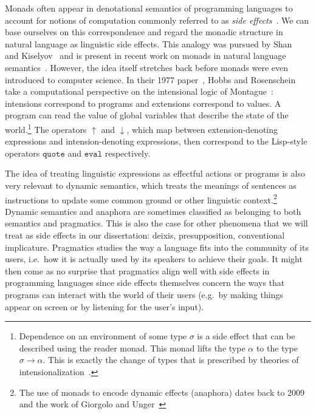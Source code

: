 Monads often appear in denotational semantics of programming languages to
account for notions of computation commonly referred to as \emph{side
  effects}~\cite{moggi1991notions}. We can base ourselves on this
correspondence and regard the monadic structure in natural language as
linguistic side effects. This analogy was pursued by
Shan~\cite{shan2005linguistic,shan2005thesis} and
Kiselyov~\cite{kiselyov2008call} and is present in recent work on monads in
natural language
semantics~\cite{giorgolo2012monads,charlow2014semantics}. However, the idea
itself stretches back before monads were even introduced to computer
science. In their 1977 paper~\cite{hobbs1977making}, Hobbs and Rosenschein
take a computational perspective on the intensional logic of
Montague~\cite{montague1973proper}: intensions correspond to programs and
extensions correspond to values. A program can read the value of global
variables that describe the state of the world.\footnote{Dependence on an
  environment of some type $\sigma$ is a side effect that can be described
  using the reader monad. This monad lifts the type $\alpha$ to the type
  $\sigma \to \alpha$. This is exactly the change of types that is
  prescribed by theories of
  intensionalization~\cite{ben2007semantics,de2013note}.} The operators
$\uparrow$ and $\downarrow$, which map between extension-denoting
expressions and intension-denoting expressions, then correspond to the
Lisp-style operators $\texttt{quote}$ and $\texttt{eval}$ respectively.

The idea of treating linguistic expressions as effectful actions or programs is
also very relevant to dynamic semantics, which treats the meanings of sentences
as instructions to update some common ground or other linguistic
context.\footnote{The use of monads to encode dynamic effects (anaphora) dates
  back to 2009 and the work of Giorgolo and
  Unger~\cite{giorgolo2009coreference,unger2012dynamic}} Dynamic semantics and
anaphora are sometimes classified as belonging to both semantics and pragmatics.
This is also the case for other phenomena that we will treat as side effects in
our dissertation: deixis, presupposition, conventional implicature. Pragmatics
studies the way a language fits into the community of its users, i.e.\ how it is
actually used by its speakers to achieve their goals. It might then come as no
surprise that pragmatics align well with side effects in programming languages
since side effects themselves concern the ways that programs can interact with
the world of their users (e.g.\ by making things appear on screen or by
listening for the user's input).


